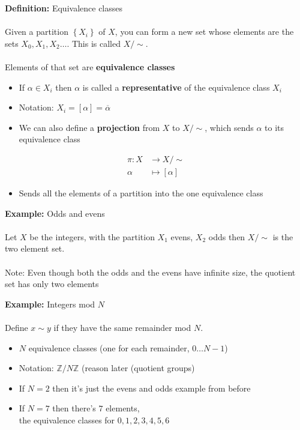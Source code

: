 \documentclass{article}
\newcommand{\Z}{\mathbb{Z}}
\begin{document}
\begin{definition}
\textbf{Definition:} Equivalence classes \\
~\\
Given a partition $\left\{X_i\right\}$ of $X$, you can form a new set whose elements are the sets $X_0, X_1, X_2 \ldots$. This is called $X/ \sim$. \\
~\\ 
Elements of that set are {\color{blue} \textbf{equivalence classes}}
\begin{itemize}
	\item If $\alpha\in X_i$ then $\alpha$ is called a {\color{blue} \textbf{representative}} of the equivalence class $X_i$
	\item Notation: $X_i = \left[\alpha\right] = \overline{\alpha}$
	\item We can also define a {\color{blue} \textbf{projection}} from $X$ to $X /\sim$, which sends $\alpha$ to its equivalence class
\end{itemize}
\begin{align}
	\pi: X &\to X /\sim \\
           \alpha &\mapsto \left[\alpha\right]
\end{align}
\begin{itemize}
	\item Sends all the elements of a partition into the one equivalence class
\end{itemize}
\end{definition}
\begin{example} 
\textbf{Example:} Odds and evens \\
~\\
Let $X$ be the integers, with the partition $X_1$ evens, $X_2$ odds then $X /\sim$ is the two element set. ~\\
~\\
Note: Even though both the odds and the evens have infinite size, the quotient set has only two elements
\end{example}
\begin{example} 
\textbf{Example:} Integers mod $N$ \\
~\\
Define $x \sim y$ if they have the same remainder mod $N$.
\begin{itemize}
	\item $N$ equivalence classes (one for each remainder, $0\ldots N-1$)
	\item Notation: $\Z /N\Z$ (reason later (quotient groups)
	\item If $N=2$ then it's just the evens and odds example from before
	\item If $N=7$ then there's $7$ elements, \\
		the equivalence classes for $0,1,2,3,4,5,6$
\end{itemize}
\end{example}
\end{document}
